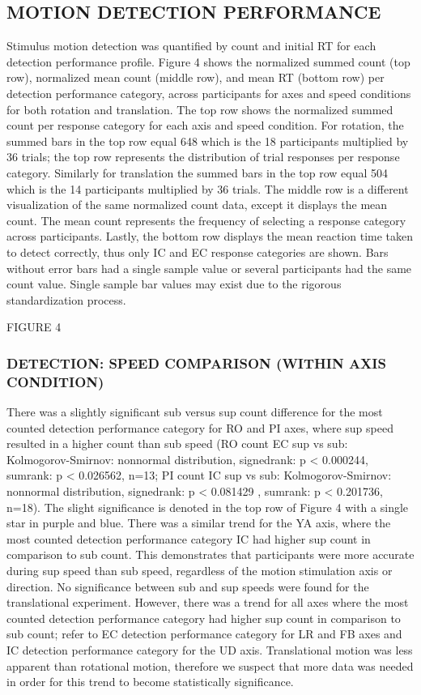 \documentclass[11pt, onecolumn]{article}
\begin{document}
\subsection{MOTION DETECTION PERFORMANCE}
Stimulus motion detection was quantified by count and initial RT for each detection performance profile.  Figure 4 shows the normalized summed count (top row), normalized mean count (middle row), and mean RT (bottom row) per detection performance category, across participants for axes and speed conditions for both rotation and translation.  The top row shows the normalized summed count per response category for each axis and speed condition. For rotation, the summed bars in the top row equal 648 which is the 18 participants multiplied by 36 trials; the top row represents the distribution of trial responses per response category.  Similarly for translation the summed bars in the top row equal 504 which is the 14 participants multiplied by 36 trials.  The middle row is a different visualization of the same normalized count data, except it displays the mean count.  The mean count represents the frequency of selecting a response category across participants.  Lastly, the bottom row displays the mean reaction time taken to detect correctly, thus only IC and EC response categories are shown. Bars without error bars had a single sample value or several participants had the same count value.  Single sample bar values may exist due to the rigorous standardization process.

FIGURE 4

\subsubsection{DETECTION: SPEED COMPARISON (WITHIN AXIS CONDITION)}
There was a slightly significant sub versus sup count difference for the most counted detection performance category for RO and PI axes, where sup speed resulted in a higher count than sub speed (RO count EC sup vs sub: Kolmogorov-Smirnov: nonnormal distribution, signedrank: p < 0.000244, sumrank: p < 0.026562, n=13; PI count IC sup vs sub: Kolmogorov-Smirnov: nonnormal distribution, signedrank: p < 0.081429 , sumrank: p < 0.201736, n=18).  The slight significance is denoted in the top row of Figure 4 with a single star in purple and blue.  There was a similar trend for the YA axis, where the most counted detection performance category IC had higher sup count in comparison to sub count.  This demonstrates that participants were more accurate during sup speed than sub speed, regardless of the motion stimulation axis or direction.  No significance between sub and sup speeds were found for the translational experiment.  However, there was a trend for all axes where the most counted detection performance category had higher sup count in comparison to sub count; refer to EC detection performance category for LR and FB axes and IC detection performance category for the UD axis.  Translational motion was less apparent than rotational motion, therefore we suspect that more data was needed in order for this trend to become statistically significance.
\end{document}
